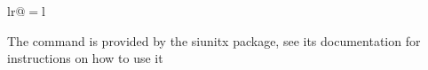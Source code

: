 \begin{constants}{lr@{${}={}$}l} %

The \SI{}{} command is provided by the siunitx package, see its documentation for instructions on how to use it

\end{constants}